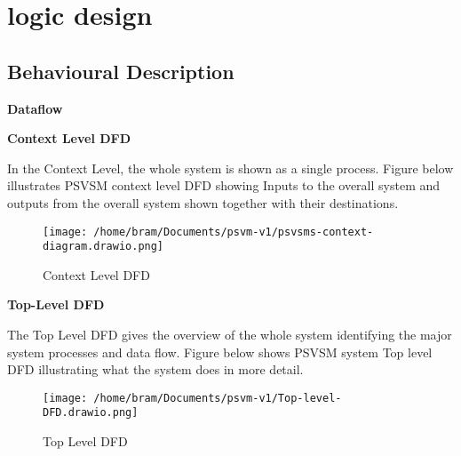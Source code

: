 \documentclass[a4paper, 12pt]{report}
\begin{document}
\section{logic design}
\subsection{Behavioural Description}
\textbf{Dataflow}


\textbf{Context Level DFD}\par
\noindent In the Context Level, the whole system is shown as a single process.
Figure below illustrates PSVSM context level DFD showing Inputs to the overall system and
outputs from the overall system shown together with their destinations.
\begin{figure}[h] %
  \centering
  \texttt{[image: /home/bram/Documents/psvm-v1/psvsms-context-diagram.drawio.png]} %
  \caption{Context Level DFD} %
  \label{fig:context level DFD} %
\end{figure}

\textbf {Top-Level DFD} \par
\noindent The Top Level DFD gives the overview of the whole system identifying the major system
processes and data flow. Figure below shows PSVSM system Top level DFD illustrating what the
system does in more detail.
\begin{figure}[h] %
  \centering
  \texttt{[image: /home/bram/Documents/psvm-v1/Top-level-DFD.drawio.png]} %
  \caption{Top Level DFD} %
  \label{fig:Top level DFD} %
\end{figure}
\end{document}
